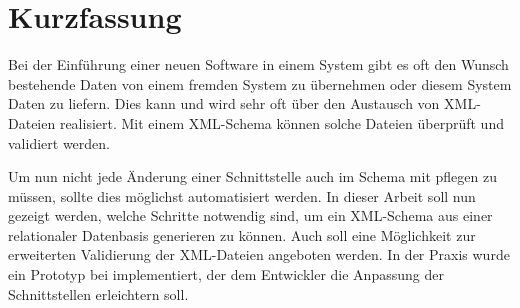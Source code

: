 \chapter{Kurzfassung}

Bei der Einführung einer neuen Software in einem System gibt es oft den Wunsch bestehende Daten von einem fremden System zu übernehmen oder diesem System Daten zu liefern. Dies kann und wird sehr oft über den Austausch von XML-Dateien realisiert. Mit einem XML-Schema können solche Dateien überprüft und validiert werden.

Um nun nicht jede Änderung einer Schnittstelle auch im Schema mit pflegen zu müssen, sollte dies möglichst automatisiert werden. In dieser Arbeit soll nun gezeigt werden, welche Schritte notwendig sind, um ein XML-Schema aus einer relationaler Datenbasis generieren zu können. 
Auch soll eine Möglichkeit zur erweiterten Validierung der XML-Dateien angeboten werden. 
In der Praxis wurde ein Prototyp bei \BMD implementiert, der dem Entwickler die Anpassung der Schnittstellen erleichtern soll.